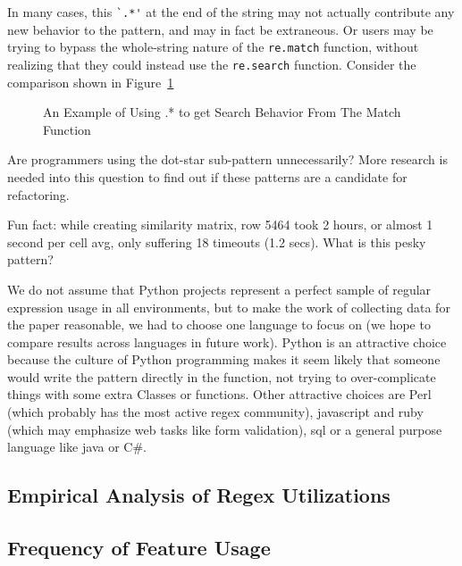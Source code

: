 In many cases, this \verb!`.*'! at the end of the string may not actually contribute any new behavior to the pattern, and may in fact be extraneous.  Or users may be trying to bypass the whole-string nature of the {\tt re.match} function, without realizing that they could instead use the {\tt re.search} function.  Consider the comparison shown in Figure~\ref{fig:searchVSmatch}

\begin{figure}[tb]
\centering
{}
\caption{An Example of Using .* to get Search Behavior From The Match Function}
\label{fig:searchVSmatch}
\end{figure}

Are programmers using the dot-star sub-pattern unnecessarily? More research is needed into this question to find out if these patterns are a candidate for refactoring.






Fun fact: while creating similarity matrix, row 5464 took 2 hours, or almost 1 second per cell avg, only suffering 18 timeouts (1.2 secs).  What is this pesky pattern?

We do not assume that Python projects represent a perfect sample of regular expression usage in all environments, but to make the work of collecting data for the paper reasonable, we had to choose one language to focus on (we hope to compare results across languages in future work).  Python is an attractive choice because the culture of Python programming makes it seem likely that someone would write the pattern directly in the function, not trying to over-complicate things with some extra Classes or functions.  Other attractive choices are Perl (which probably has the most active regex community), javascript and ruby (which may emphasize web tasks like form validation), sql or a general purpose language like java or C\#.




\subsection{Empirical Analysis of Regex Utilizations}


\subsection{Frequency of Feature Usage}

